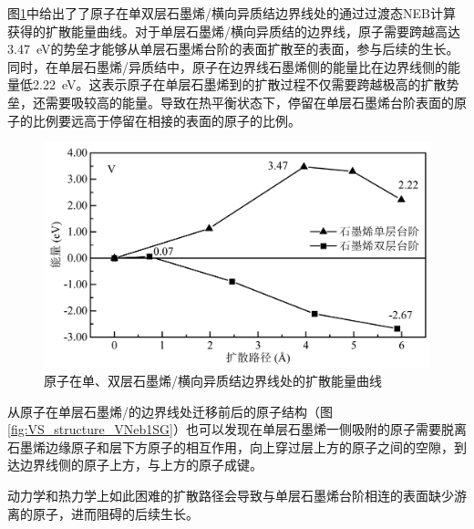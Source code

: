     图\ref{fig:VS_DFT_NEB_V_GtVSe}中给出了了原子在单双层石墨烯/横向异质结边界线处的通过过渡态NEB计算获得的扩散能量曲线。对于单层石墨烯/横向异质结的边界线，原子需要跨越高达\SI{3.47}{\electronvolt}的势垒才能够从单层石墨烯台阶的表面扩散至的表面，参与后续的生长。同时，在单层石墨烯/异质结中，原子在边界线石墨烯侧的能量比在边界线侧的能量低\SI{2.22}{\electronvolt}。这表示原子在单层石墨烯到的扩散过程不仅需要跨越极高的扩散势垒，还需要吸较高的能量。导致在热平衡状态下，停留在单层石墨烯台阶表面的原子的比例要远高于停留在相接的表面的原子的比例。

    \begin{figure}[htb]
        \includegraphics{pic/VS_DFT_NEB_V_GtVSe.png}
        \captionsetup{width=\textwidth}
        \caption{原子在单、双层石墨烯/横向异质结边界线处的扩散能量曲线}
        \label{fig:VS_DFT_NEB_V_GtVSe}
    \end{figure}
    

    从原子在单层石墨烯/的边界线处迁移前后的原子结构（图\ref{fig:VS_structure_VNeb1SG}）也可以发现在单层石墨烯一侧吸附的原子需要脱离石墨烯边缘原子和层下方原子的相互作用，向上穿过层上方的原子之间的空隙，到达边界线侧的原子上方，与上方的原子成键。

    动力学和热力学上如此困难的扩散路径会导致与单层石墨烯台阶相连的表面缺少游离的原子，进而阻碍的后续生长。

